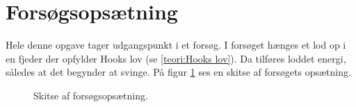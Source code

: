 \section{Forsøgsopsætning}
Hele denne opgave tager udgangspunkt i et forsøg.
I forsøget hænges et lod op i en fjeder der opfylder Hooks lov (se \ref{teori:Hooks lov}). 
Da tilføres loddet energi, således at det begynder at svinge. 
På figur \ref{fig:Basis Forsogsopsaetning} ses en skitse af forsøgets opsætning. 


\begin{figure}[ht]
\center
{}%

\caption{Skitse af forsøgsopsætning.}
\label{fig:Basis Forsogsopsaetning}
\end{figure}